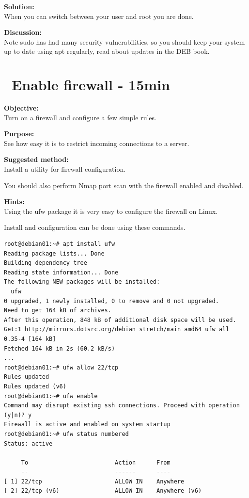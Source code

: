 \documentclass[a4paper,11pt,notitlepage]{report}
\begin{document}
{\bf Solution:}\\
When you can switch between your user and root you are done.

{\bf Discussion:}\\
Note sudo has had many security vulnerabilities, so you should keep your system up to date using apt regularly, read about updates in the DEB book.


\chapter{\faExclamationTriangle\ Enable firewall - 15min}
\label{ex:debian-firewall}

{\bf Objective:}\\
Turn on a firewall and configure a few simple rules.

{\bf Purpose:}\\
See how easy it is to restrict incoming connections to a server.


{\bf Suggested method:}\\
Install a utility for firewall configuration.

You should also perform Nmap port scan with the firewall enabled and disabled.

{\bf Hints:}\\
Using the ufw package it is very easy to configure the firewall on Linux.

Install and configuration can be done using these commands.
\begin{verbatim}
root@debian01:~# apt install ufw
Reading package lists... Done
Building dependency tree
Reading state information... Done
The following NEW packages will be installed:
  ufw
0 upgraded, 1 newly installed, 0 to remove and 0 not upgraded.
Need to get 164 kB of archives.
After this operation, 848 kB of additional disk space will be used.
Get:1 http://mirrors.dotsrc.org/debian stretch/main amd64 ufw all 0.35-4 [164 kB]
Fetched 164 kB in 2s (60.2 kB/s)
...
root@debian01:~# ufw allow 22/tcp
Rules updated
Rules updated (v6)
root@debian01:~# ufw enable
Command may disrupt existing ssh connections. Proceed with operation (y|n)? y
Firewall is active and enabled on system startup
root@debian01:~# ufw status numbered
Status: active

     To                         Action      From
     --                         ------      ----
[ 1] 22/tcp                     ALLOW IN    Anywhere
[ 2] 22/tcp (v6)                ALLOW IN    Anywhere (v6)
\end{verbatim}
\end{document}
